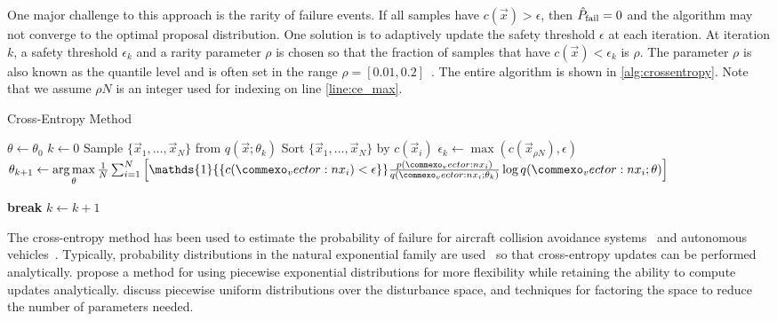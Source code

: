 One major challenge to this approach is the rarity of failure events. If all samples have $c(\vec{x}) > \epsilon$, then $\hat{P}_{\rm fail} =0$ and the algorithm may not converge to the optimal proposal distribution. One solution is to adaptively update the safety threshold $\epsilon$ at each iteration. At iteration $k$, a safety threshold $\epsilon_k$ and a rarity parameter $\rho$ is chosen so that the fraction of samples that have $c(\vec{x}) < \epsilon_k$ is $\rho$. The parameter $\rho$ is also known as the quantile level and is often set in the range $\rho = [0.01, 0.2]$~\cite{kim2016improving,okelly2018scalable}. The entire algorithm is shown in \cref{alg:crossentropy}. Note that we assume $\rho N$ is an integer used for indexing on line \ref{line:ce_max}. 

\begin{algorithm}
\caption{Cross-Entropy Method} \label{alg:crossentropy}
\begin{algorithmic}[1]
    \State $\theta \gets \theta_0$
    \State $k \gets 0$
    \Loop
        \State Sample $\{\vec{x}_1, \ldots, \vec{x}_N \}$ from $q(\vec{x}; \theta_k)$
        \State Sort $\{ \vec{x}_1, \ldots, \vec{x}_N \}$ by $c(\vec{x}_i)$ 
        \State $\epsilon_k \gets \max(c(\vec{x}_{\rho N}), \epsilon)$ \label{line:ce_max}
        \State $\theta_{k+1} \gets \argmax\limits_\theta \frac{1}{N} \sum_{i=1}^N \left[ \mathds{1}{\{c(\vec{x}_i) < \epsilon \}} \frac{p(\vec{x}_i)}{q(\vec{x}_i; \theta_{k})}\log q(\vec{x}_i; \theta) \right]$
        
            \State \textbf{break}
        \EndIf
        \State $k \gets k+1$
    \EndLoop
    \State {}
    \EndFunction
    \end{algorithmic}
\end{algorithm}


The cross-entropy method has been used to estimate the probability of failure for aircraft collision avoidance systems~\cite{kim2016improving} and autonomous vehicles~\cite{okelly2018scalable,zhao2016accelerated,huang2017accelerated}. Typically, probability distributions in the natural exponential family are used~\cite{kim2016improving,okelly2018scalable,zhao2016accelerated} so that cross-entropy updates can be performed analytically. \textcite{huang2017accelerated} propose a method for using piecewise exponential distributions for more flexibility while retaining the ability to compute updates analytically. \textcite{sankaranarayanan2012falsification}  discuss piecewise uniform distributions over the disturbance space, and techniques for factoring the space to reduce the number of parameters needed.

